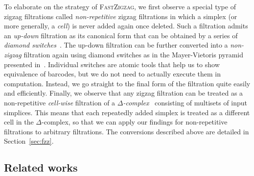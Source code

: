 \documentclass[letterpaper,11pt]{article}
\theoremstyle{mythmstyle}
\theoremstyle{mydefstyle}
\theoremstyle{plain}
\theoremstyle{definition}
\newcommand{\<}[1]{\langle #1\rangle}
\newcommand{\DG}{\Delta}
\begin{document}
To elaborate on the strategy of \textsc{FastZigzag}, we first observe 
a special type of zigzag filtrations 
called \emph{non-repetitive} zigzag filtrations in which
a simplex (or more generally, a \emph{cell}) is never added again once deleted. Such a filtration
admits an {\it up-down} filtration as its canonical form that can be
obtained by a series of \emph{diamond switches}~\cite{carlsson2010zigzag,carlsson2019parametrized,carlsson2009zigzag-realvalue}.
The up-down filtration can be further converted
into a {\it non-zigzag} filtration again using diamond switches as in the Mayer-Vietoris
pyramid presented in~\cite{carlsson2009zigzag-realvalue}. 
Individual switches are atomic tools that help us to show equivalence of barcodes, but
we do not need to actually execute them in computation.
Instead, we go straight
to the final form of the filtration quite easily and efficiently.
Finally, we observe that any zigzag filtration 
can be treated as a non-repetitive \emph{cell-wise} 
filtration of a \emph{$\DG$-complex}~\cite{hatcher2002algebraic} 
consisting of multisets of input simplices. 
This means that each repeatedly added
simplex is treated as a different cell in the $\DG$-complex, 
so that we can apply 
our findings for non-repetitive filtrations to
arbitrary filtrations.
The conversions
described above are detailed in Section~\ref{sec:fzz}.



\subsection{Related works}
\end{document}
